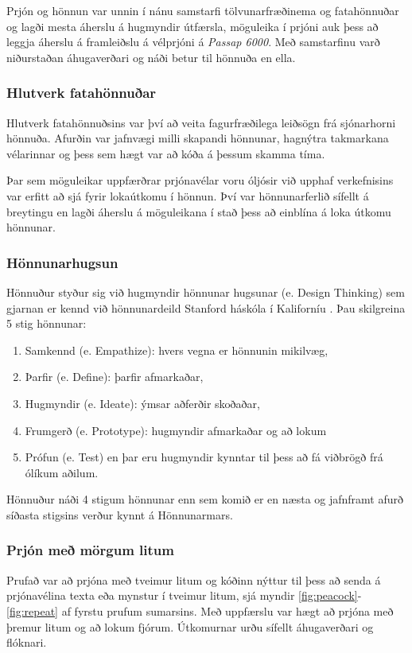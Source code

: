 Prjón og hönnun var unnin í nánu samstarfi tölvunarfræðinema og fatahönnuðar og lagði mesta áherslu á hugmyndir útfærsla, möguleika í prjóni auk þess að leggja áherslu á framleiðslu á vélprjóni á \textit{Passap 6000}. Með  samstarfinu varð niðurstaðan áhugaverðari og náði betur til hönnuða en ella. 

\subsubsection{Hlutverk fatahönnuðar}
Hlutverk fatahönnuðsins var því að veita fagurfræðilega leiðsögn frá sjónarhorni hönnuða. Afurðin var jafnvægi milli skapandi hönnunar, hagnýtra takmarkana vélarinnar og þess sem hægt var að kóða á þessum skamma tíma. 

Þar sem möguleikar uppfærðrar prjónavélar voru óljósir við upphaf verkefnisins var erfitt að sjá fyrir lokaútkomu í hönnun. Því var hönnunarferlið sífellt á breytingu en lagði áherslu á möguleikana í stað þess að einblína á loka útkomu hönnunar. 

\subsubsection{Hönnunarhugsun}
Hönnuður styður sig við hugmyndir hönnunar hugsunar (e. Design Thinking) sem gjarnan er kennd við hönnunardeild Stanford háskóla í Kaliforníu \cite{designthinking}.  Þau skilgreina 5 stig hönnunar:
\begin{enumerate}
    \item Samkennd (e. Empathize): hvers vegna er hönnunin mikilvæg,
    \item Þarfir (e. Define): þarfir afmarkaðar,
    \item Hugmyndir (e. Ideate): ýmsar aðferðir skoðaðar,
    \item Frumgerð (e. Prototype): hugmyndir afmarkaðar og að lokum
    \item Prófun (e. Test) en þar eru hugmyndir kynntar til þess að fá viðbrögð frá ólíkum aðilum.
\end{enumerate}
Hönnuður náði  4 stigum hönnunar enn sem komið er en næsta og jafnframt afurð síðasta stigsins verður kynnt á Hönnunarmars.

\subsubsection{Prjón með mörgum litum}
Prufað var að prjóna með tveimur litum og kóðinn nýttur til þess að senda á prjónavélina texta eða mynstur í tveimur litum, sjá myndir \ref{fig:peacock}-\ref{fig:repeat} af fyrstu prufum sumarsins. Með uppfærslu var hægt að prjóna með þremur litum og að lokum fjórum. Útkomurnar urðu sífellt áhugaverðari og flóknari. 

